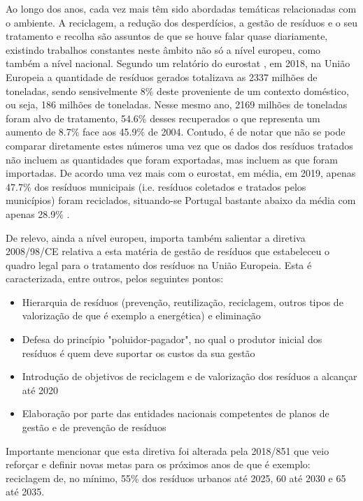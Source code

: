 \documentclass[11pt, a4paper, oneside]{book}
\begin{document}
Ao longo dos anos, cada vez mais têm sido abordadas temáticas relacionadas com o ambiente. A reciclagem, a redução dos desperdícios, a gestão de resíduos e o seu tratamento e recolha são assuntos de que se houve falar quase diariamente, existindo trabalhos constantes neste âmbito não só a nível europeu, como também a nível nacional.
Segundo um relatório do eurostat \cite{waste-generation-2018}, em 2018, na União Europeia a quantidade de resíduos gerados totalizava as 2337 milhões de toneladas, sendo sensivelmente 8\% deste proveniente de um contexto doméstico, ou seja, 186 milhões de toneladas. Nesse mesmo ano, 2169 milhões de toneladas foram alvo de tratamento, 54.6\% desses recuperados o que representa um aumento de 8.7\% face aos 45.9\% de 2004. Contudo, é de notar que não se pode comparar diretamente estes números uma vez que os dados dos resíduos tratados não incluem as quantidades que foram exportadas, mas incluem as que foram importadas.
De acordo uma vez mais com o eurostat, em média, em 2019, apenas 47.7\% dos resíduos municipais (i.e. resíduos coletados e tratados pelos municípios) foram reciclados, situando-se Portugal bastante abaixo da média com apenas 28.9\% \cite{recycling-municipal-waste}.

De relevo, ainda a nível europeu, importa também salientar a diretiva 2008/98/CE relativa a esta matéria de gestão de resíduos que estabeleceu o quadro legal para o tratamento dos resíduos na União Europeia. Esta é caracterizada, entre outros, pelos seguintes pontos:
\begin{itemize}
    \itemsep0em
    \item Hierarquia de resíduos (prevenção, reutilização, reciclagem, outros tipos de valorização de que é exemplo a energética) e eliminação
    \item Defesa do princípio "poluidor-pagador", no qual o produtor inicial dos resíduos é quem deve suportar os custos da sua gestão
    \item Introdução de objetivos de reciclagem e de valorização dos resíduos a alcançar até 2020
    \item Elaboração por parte das entidades nacionais competentes de planos de gestão e de prevenção de resíduos
\end{itemize}
Importante mencionar que esta diretiva foi alterada pela 2018/851 \cite{diretiva-2018-851} que veio reforçar e definir novas metas para os próximos anos de que é exemplo: reciclagem de, no mínimo, 55\% dos resíduos urbanos até 2025, 60 até 2030 e 65 até 2035.
\end{document}
